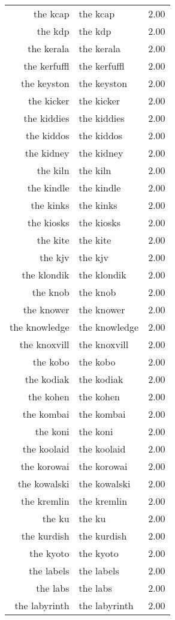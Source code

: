 \begin{table}[ht]
\begin{tabular}{rlr}
  the kcap & the kcap & 2.00 \\ 
  the kdp & the kdp & 2.00 \\ 
  the kerala & the kerala & 2.00 \\ 
  the kerfuffl & the kerfuffl & 2.00 \\ 
  the keyston & the keyston & 2.00 \\ 
  the kicker & the kicker & 2.00 \\ 
  the kiddies & the kiddies & 2.00 \\ 
  the kiddos & the kiddos & 2.00 \\ 
  the kidney & the kidney & 2.00 \\ 
  the kiln & the kiln & 2.00 \\ 
  the kindle & the kindle & 2.00 \\ 
  the kinks & the kinks & 2.00 \\ 
  the kiosks & the kiosks & 2.00 \\ 
  the kite & the kite & 2.00 \\ 
  the kjv & the kjv & 2.00 \\ 
  the klondik & the klondik & 2.00 \\ 
  the knob & the knob & 2.00 \\ 
  the knower & the knower & 2.00 \\ 
  the knowledge & the knowledge & 2.00 \\ 
  the knoxvill & the knoxvill & 2.00 \\ 
  the kobo & the kobo & 2.00 \\ 
  the kodiak & the kodiak & 2.00 \\ 
  the kohen & the kohen & 2.00 \\ 
  the kombai & the kombai & 2.00 \\ 
  the koni & the koni & 2.00 \\ 
  the koolaid & the koolaid & 2.00 \\ 
  the korowai & the korowai & 2.00 \\ 
  the kowalski & the kowalski & 2.00 \\ 
  the kremlin & the kremlin & 2.00 \\ 
  the ku & the ku & 2.00 \\ 
  the kurdish & the kurdish & 2.00 \\ 
  the kyoto & the kyoto & 2.00 \\ 
  the labels & the labels & 2.00 \\ 
  the labs & the labs & 2.00 \\ 
  the labyrinth & the labyrinth & 2.00 \\ 

\end{tabular}
\end{table}

